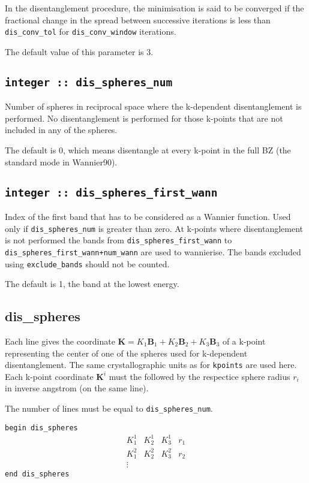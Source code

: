 In the disentanglement procedure, the minimisation is said to be converged
if the fractional change in the spread between successive
iterations is less than
\verb#dis_conv_tol# for \verb#dis_conv_window# iterations.

The default value of this parameter is 3.

\subsection[dis\_spheres\_num]{\tt integer :: dis\_spheres\_num}
Number of spheres in reciprocal space where the k-dependent
disentanglement is performed. No disentanglement is performed for 
those k-points that are not included in any of the spheres.

The default is 0, which means disentangle at every k-point in the full BZ (the standard mode in Wannier90).


\subsection[dis\_spheres\_first\_wann]{\tt integer :: dis\_spheres\_first\_wann}
Index of the first band that has to be considered as a Wannier function. Used only if {\tt dis\_spheres\_num} is greater than zero.
At k-points where disentanglement is not performed the bands from
{\tt dis\_spheres\_first\_wann} to {\tt dis\_spheres\_first\_wann+num\_wann} are used
to wannierise. The bands excluded using {\tt exclude\_bands} should not
be counted.

The default is 1, the band at the lowest energy.


\subsection[dis\_spheres]{dis\_spheres}
Each line gives the coordinate $\mathbf{K}=K_1 \mathbf{B}_{1} + K_2
\mathbf{B}_{2} + K_3 \mathbf{B}_3$ of a k-point representing the
center of one of the spheres used for k-dependent disentanglement.
The same crystallographic units as for {\tt kpoints} are used here.
Each k-point coordinate $\mathbf{K}^i$ must the followed by the 
respectice sphere radius $r_{i}$ in inverse angstrom (on the same line).

The number of lines must be equal to {\tt dis\_spheres\_num}.

\noindent  \verb#begin dis_spheres#
$$
\begin{array}{cccc}
 K^{1}_{1} & K^{1}_{2} & K^{1}_{3} & r_{1} \\
 K^{2}_{1} & K^{2}_{2} & K^{2}_{3} & r_{2} \\
\vdots
\end{array}
$$
\verb#end dis_spheres#

